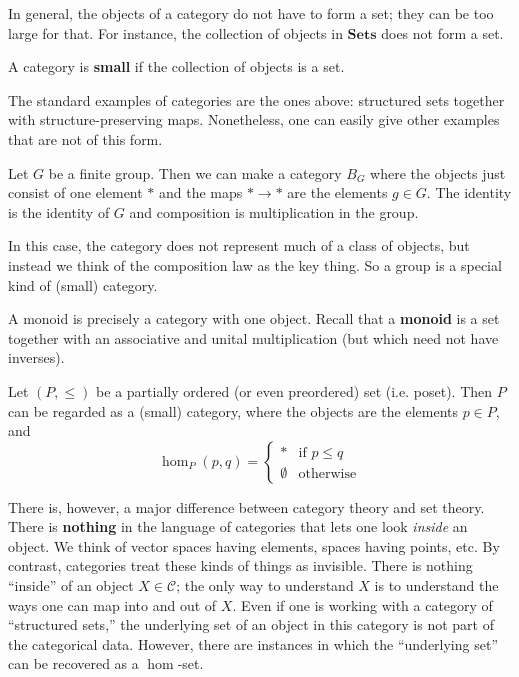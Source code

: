 In general, the objects of a category do not have to form a set; they can
be too large for
that.
For instance, the collection of objects in $\mathbf{Sets}$ does not form a set.


\begin{definition}
A category is \textbf{small} if the collection of objects is a set.
\end{definition}

The standard examples of categories are the ones above: structured sets
together with structure-preserving maps. Nonetheless, one can easily give
other examples that are not of this form.

\begin{example} \label{BG}
Let $G$ be a finite group. Then we can make a category $B_G$ where the objects
just consist of one element $\ast$ and the maps $\ast \to \ast$ are the elements
 $g \in G$. The identity is the identity of $G$ and composition is multiplication
in the group.

In this case, the category does not represent much of  a class of objects, but
instead we think of the composition law as the key thing. So a group is a
special kind of (small) category.
\end{example}

\begin{example}
A monoid is precisely a category with one object. Recall that a \textbf{monoid}
is a set together with  an associative and unital multiplication (but which
need not have inverses).
\end{example}


\begin{example} \label{posetcategory} Let $(P, \leq)$ be a partially ordered
 (or even preordered) set (i.e. poset). Then $P$ can be regarded as a (small) category, where the objects are the elements
$p \in P$, and $$\hom_P(p, q) = \begin{cases} 
\ast & \text{if } p \leq q \\
\emptyset & \text{otherwise}
 \end{cases} $$
\end{example} 

There is, however, a major difference between category theory and set theory.
There is \textbf{nothing} in the language of categories that lets one look
\emph{inside} an object. We think of vector spaces having elements, spaces
having points, etc.
By contrast, categories treat these kinds of things as invisible. There
is nothing ``inside'' of an object $X \in \mathcal{C}$; the only way to
understand $X$ is
to understand the ways one can map into and out of $X$.
Even if one is working with  a category of ``structured sets,'' the underlying
set of an object in this category is not part of the categorical data.
However, there are instances in which the ``underlying set'' can be recovered
as a $\hom$-set.


